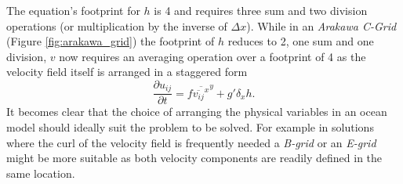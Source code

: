 The equation's footprint for $h$ is 4 and requires three sum and two division operations (or multiplication by the inverse of $\Delta x$).  While in an \textit{Arakawa C-Grid} (Figure \ref{fig:arakawa_grid}) the footprint of $h$ reduces to 2, one sum and one division, $v$ now requires an averaging operation over a footprint of 4 as the velocity field itself is arranged in a staggered form 
\begin{equation}
\frac{\partial u_{ij}}{\partial t} = f \overline{\overline{v_{ij}}^x}^y + g'\delta_x h.
\end{equation}
It becomes clear that the choice of arranging the physical variables in an ocean model should ideally suit the problem to be solved.  For example in solutions where the curl of the velocity field is frequently needed a \textit{B-grid} or an \textit{E-grid} might be more suitable as both velocity components are readily defined in the same location.
%

